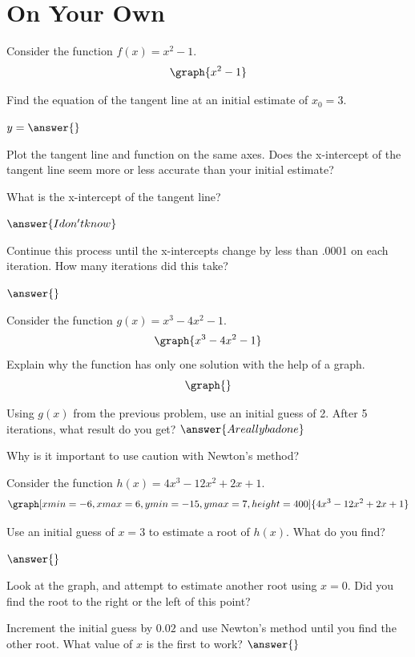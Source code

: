 \documentclass{ximera}
\begin{document}
\section{On Your Own}
\begin{question}
Consider the function $f(x) = x^2-1$.
\[
\graph{x^2-1}
\]

Find the equation of the tangent line at an initial estimate of $x_0=3$.

$y = \answer{}$

Plot the tangent line and function on the same axes. Does the x-intercept of the tangent line seem more or less accurate than your initial estimate?

\begin{multipleChoice}
\end{multipleChoice}

What is the x-intercept of the tangent line?

$\answer{I don't know}$

Continue this process until the x-intercepts change by less than .0001 on each iteration. How many iterations did this take?

$\answer{}$
\end{question}
\begin{question}
Consider the function $g(x) = x^3-4x^2-1$.
\[
\graph{x^3-4x^2-1}
\]
Explain why the function has only one solution with the help of a graph.
\[
\graph{}
\]
\begin{freeResponse}
\end{freeResponse}
Using $g(x)$ from the previous problem, use an initial guess of 2. After 5 iterations, what result do you get?
$\answer{A really bad one}$

Why is it important to use caution with Newton's method?
\begin{freeResponse}
\end{freeResponse}
\end{question}

\begin{question}
Consider the function $h(x) = 4x^3 - 12x^2 + 2x + 1$.
\[
\graph[xmin=-6,xmax=6,ymin=-15,ymax=7,height=400]{4x^3 - 12x^2 + 2x + 1}
\]

Use an initial guess of $x=3$ to estimate a root of $h(x)$. What do you find?

$\answer{}$

Look at the graph, and attempt to estimate another root using $x = 0$. Did you find the root to the right or the left of this point?

\begin{multipleChoice}
\end{multipleChoice}

Increment the initial guess by $0.02$ and use Newton's method until you find the other root. What value of $x$ is the first to work?
$\answer{}$
\end{question}
\end{document}
